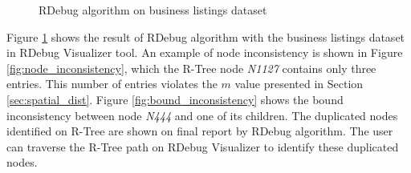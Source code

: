 \begin{figure}[h]
  \centering
   \qquad
  \caption{RDebug algorithm on business listings dataset}
  \label{fig:rdebug_pois}
\end{figure}

Figure \ref{fig:rdebug_pois} shows the result of RDebug algorithm with the business listings dataset in RDebug Visualizer tool. 
An example of node inconsistency is shown in Figure \ref{fig:node_inconsistency}, which the R-Tree node \textit{N1127} contains only three entries.
This number of entries violates the $m$ value presented in Section \ref{sec:spatial_dist}.
Figure \ref{fig:bound_inconsistency} shows the bound inconsistency between node \textit{N444} and one of its children.
The duplicated nodes identified on R-Tree are shown on final report by RDebug algorithm. 
The user can traverse the R-Tree path on RDebug Visualizer to identify these duplicated nodes.
